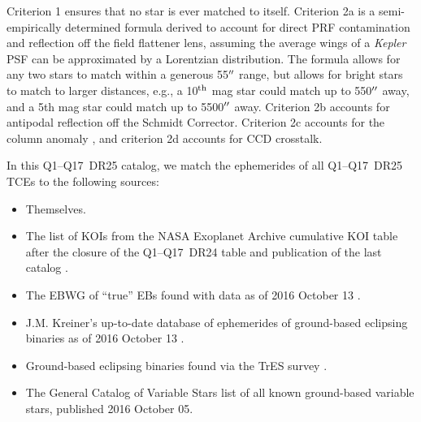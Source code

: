 \noindent Criterion 1 ensures that no star is ever matched to itself. Criterion 2a is a semi-empirically determined formula derived to account for direct PRF contamination and reflection off the field flattener lens, assuming the average wings of a \emph{Kepler} PSF can be approximated by a Lorentzian distribution. The formula allows for any two stars to match within a generous 55$\mbox{$^{\prime\prime}$}$ range, but allows for bright stars to match to larger distances, e.g., a 10$^{\rm th}$ mag star could match up to 550$\mbox{$^{\prime\prime}$}$ away, and a 5th mag star could match up to 5500$\mbox{$^{\prime\prime}$}$ away. Criterion 2b accounts for antipodal reflection off the Schmidt Corrector. Criterion 2c accounts for the column anomaly \citep[see \S3.5 of][]{Coughlin2016}, and criterion 2d accounts for CCD crosstalk.


In this Q1--Q17~DR25 catalog, we match the ephemerides of all Q1--Q17~DR25 TCEs \citep{Twicken2016} to the following sources:

\begin{itemize}
 \item Themselves.
 \item The list of \npredrtwentyfivekois{} KOIs from the NASA Exoplanet Archive cumulative KOI table after the closure of the Q1--Q17~DR24 table and publication of the last catalog \citep{Coughlin2016}.
 \item The \kepler{} EBWG of \nkebs{} “true” EBs found with \kepler{} data as of 2016 October 13 \citep{Prsa2011,Slawson2011,Kirk2016}.
 \item J.M. Kreiner's up-to-date database of ephemerides of ground-based eclipsing binaries as of 2016 October 13 \citep{Kreiner2004}.
 \item Ground-based eclipsing binaries found via the TrES survey \citep{Devor2008a}.
 \item The General Catalog of Variable Stars \citep[GCVS][]{Samus2015} list of all known ground-based variable stars, published 2016 October 05.
\end{itemize}










